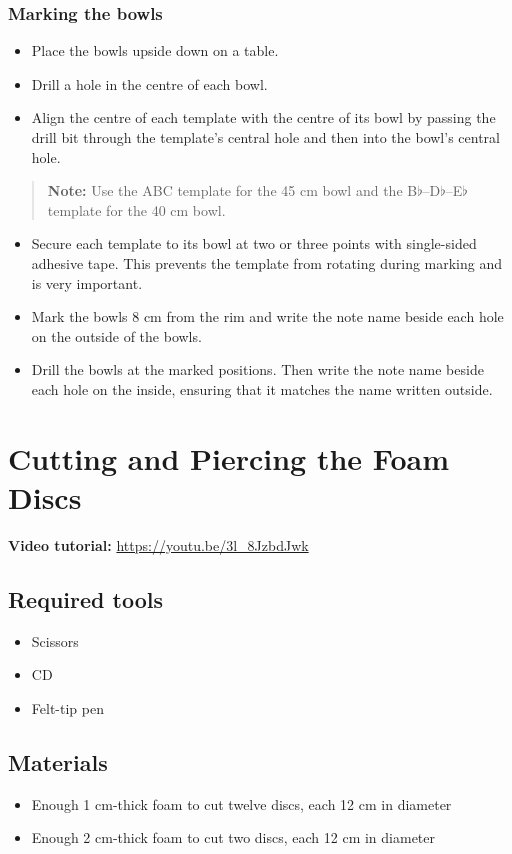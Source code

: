 \documentclass[11pt,a4paper]{article}
\newcommand{\tutorial}[1]{\textbf{Video tutorial:} \url{#1}}
\newcommand{\tools}{\subsection{Required tools}}
\newcommand{\materials}{\subsection{Materials}}
\newcommand{\note}[1]{\begin{quote}\textbf{Note:} #1\end{quote}}
\begin{document}
\subsubsection{Marking the bowls}
\begin{itemize}
  \item Place the bowls upside down on a table.
  \item Drill a hole in the centre of each bowl.
  \item Align the centre of each template with the centre of its bowl by passing the drill bit through the template's central hole and then into the bowl's central hole.
\end{itemize}

\note{Use the ABC template for the 45 cm bowl and the B$\flat$--D$\flat$--E$\flat$ template for the 40 cm bowl.}

\begin{itemize}
  \item Secure each template to its bowl at two or three points with single-sided adhesive tape. This prevents the template from rotating during marking and is very important.
  \item Mark the bowls 8 cm from the rim and write the note name beside each hole on the outside of the bowls.
  \item Drill the bowls at the marked positions. Then write the note name beside each hole on the inside, ensuring that it matches the name written outside.
\end{itemize}

\section{Cutting and Piercing the Foam Discs}
\tutorial{https://youtu.be/3l_8JzbdJwk}

\tools
\begin{itemize}
  \item Scissors
  \item CD
  \item Felt-tip pen
\end{itemize}

\materials
\begin{itemize}
  \item Enough 1 cm-thick foam to cut twelve discs, each 12 cm in diameter
  \item Enough 2 cm-thick foam to cut two discs, each 12 cm in diameter
\end{itemize}
\end{document}
